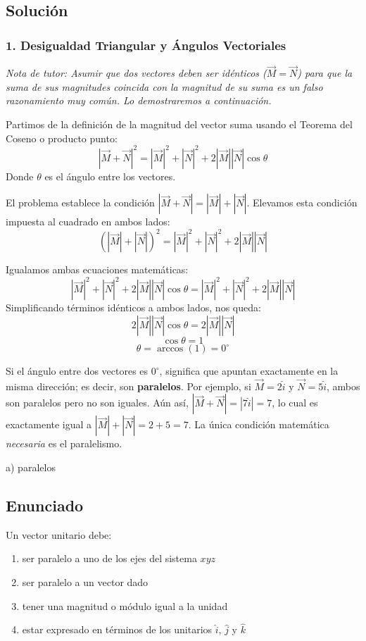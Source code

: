 \documentclass[12pt, a4paper]{article}
\begin{document}
\subsection*{Solución}

\subsubsection*{1. Desigualdad Triangular y Ángulos Vectoriales}
\textit{Nota de tutor: Asumir que dos vectores deben ser idénticos ($\vec{M}=\vec{N}$) para que la suma de sus magnitudes coincida con la magnitud de su suma es un falso razonamiento muy común. Lo demostraremos a continuación.}

Partimos de la definición de la magnitud del vector suma usando el Teorema del Coseno o producto punto:
$$ |\vec{M} + \vec{N}|^2 = |\vec{M}|^2 + |\vec{N}|^2 + 2|\vec{M}||\vec{N}| \cos \theta $$
Donde $\theta$ es el ángulo entre los vectores.

El problema establece la condición $|\vec{M} + \vec{N}| = |\vec{M}| + |\vec{N}|$. 
Elevamos esta condición impuesta al cuadrado en ambos lados:
$$ (|\vec{M}| + |\vec{N}|)^2 = |\vec{M}|^2 + |\vec{N}|^2 + 2|\vec{M}||\vec{N}| $$

Igualamos ambas ecuaciones matemáticas:
$$ |\vec{M}|^2 + |\vec{N}|^2 + 2|\vec{M}||\vec{N}| \cos \theta = |\vec{M}|^2 + |\vec{N}|^2 + 2|\vec{M}||\vec{N}| $$
Simplificando términos idénticos a ambos lados, nos queda:
$$ 2|\vec{M}||\vec{N}| \cos \theta = 2|\vec{M}||\vec{N}| $$
$$ \cos \theta = 1 $$
$$ \theta = \arccos(1) = 0^\circ $$

Si el ángulo entre dos vectores es $0^\circ$, significa que apuntan exactamente en la misma dirección; es decir, son \textbf{paralelos}. 
Por ejemplo, si $\vec{M} = 2\hat{i}$ y $\vec{N} = 5\hat{i}$, ambos son paralelos pero no son iguales. Aún así, $|\vec{M}+\vec{N}| = |7\hat{i}| = 7$, lo cual es exactamente igual a $|\vec{M}| + |\vec{N}| = 2 + 5 = 7$. La única condición matemática \textit{necesaria} es el paralelismo.

\begin{tcolorbox}[colback=green!5!white, colframe=green!50!black, title=Respuesta Final]
\centering \Large a) paralelos
\end{tcolorbox}

\newpage


\subsection*{Enunciado}
Un vector unitario debe:
\begin{enumerate}[label=\alph*)]
    \item ser paralelo a uno de los ejes del sistema $xyz$
    \item ser paralelo a un vector dado
    \item tener una magnitud o módulo igual a la unidad
    \item estar expresado en términos de los unitarios $\hat{i}$, $\hat{j}$ y $\hat{k}$
\end{enumerate}
\end{document}
